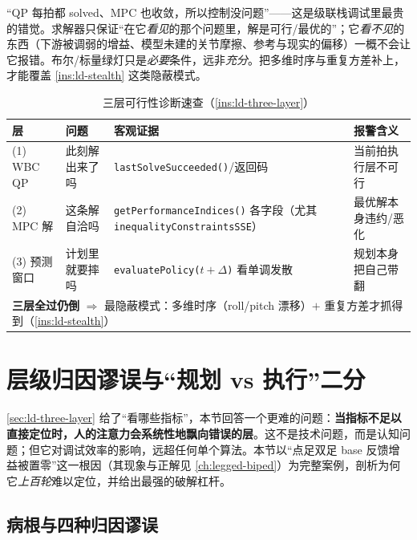 \begin{pitfall}
“QP 每拍都 solved、MPC 也收敛，所以控制没问题”——这是级联栈调试里最贵的错觉。求解器只保证“在它\emph{看见}的那个问题里，解是可行/最优的”；它\emph{看不见}的东西（下游被调弱的增益、模型未建的关节摩擦、参考与现实的偏移）一概不会让它报错。布尔/标量绿灯只是\emph{必要}条件，远非\emph{充分}。把多维时序与重复方差补上，才能覆盖 \cref{ins:ld-stealth} 这类隐蔽模式。
\end{pitfall}

\begin{table}[H]\centering\small
\caption{三层可行性诊断速查（\cref{ins:ld-three-layer}）}
\begin{tabular}{p{} p{} p{} p{}}
\toprule
层 & 问题 & 客观证据 & 报警含义 \\
\midrule
(1) WBC QP & 此刻解出来了吗 & \texttt{lastSolveSucceeded()}/返回码 & 当前拍执行层不可行 \\
(2) MPC 解 & 这条解自洽吗 & \texttt{getPerformanceIndices()} 各字段（尤其 \texttt{inequalityConstraintsSSE}）& 最优解本身违约/恶化 \\
(3) 预测窗口 & 计划里就要摔吗 & \texttt{evaluatePolicy($t{+}\Delta$)} 看单调发散 & 规划本身把自己带翻 \\
\midrule
\multicolumn{4}{l}{\textbf{三层全过仍倒} $\Rightarrow$ 最隐蔽模式：多维时序（roll/pitch 漂移）$+$ 重复方差才抓得到（\cref{ins:ld-stealth}）}\\
\bottomrule
\end{tabular}
\label{tab:ld-three-layer}
\end{table}

\section{层级归因谬误与“规划 vs 执行”二分}
\label{sec:ld-attribution}

\cref{sec:ld-three-layer} 给了“看哪些指标”，本节回答一个更难的问题：\textbf{当指标不足以直接定位时，人的注意力会系统性地飘向错误的层}。这不是技术问题，而是认知问题；但它对调试效率的影响，远超任何单个算法。本节以“点足双足 base 反馈增益被置零”这一根因（其现象与正解见 \cref{ch:legged-biped}）为完整案例，剖析为何它\emph{上百轮}难以定位，并给出最强的破解杠杆。

\subsection{病根与四种归因谬误}
\label{subsec:ld-fallacy}

